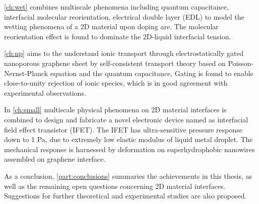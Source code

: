 \autoref{ch:wet} combines multiscale phenomena including quantum capacitance,
interfacial molecular reorientation, electrical double layer (EDL) to model
the wetting phenomena of a 2D material upon doping are. The
molecular reorientation effect is found to dominate the 2D-liquid
interfacial tension.
%

\autoref{ch:np} aims to the understand ionic transport through
electrostatically gated nano\-porous graphene sheet by
self-consistent transport theory based on Poisson-Nernst-Planck
equation and the quantum capacitance, Gating is found to enable
close-to-unity rejection of ionic species, which is in good agreement
with experimental observations.
%

In \autoref{ch:small} multiscale physical phenomena on 2D material
interfaces is combined to design and fabricate a novel electronic
device named as interfacial field effect transistor (IFET). The IFET
has ultra-sensitive pressure response down to 1 Pa, due to extremely
low elastic modulus of liquid metal droplet. The mechanical response
is harnessed by deformation on superhydrophobic nanowires assembled on
graphene interface.

As a conclusion, \autoref{part:conclusions} summaries the achievements
in this thesis, as well as the remaining open questions concerning 2D
material interfaces. Suggestions for further theoretical and
experimental studies are also proposed.


